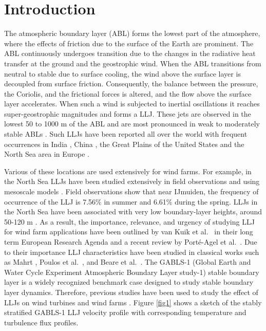 \documentclass[%
 aip,
 amsmath,amssymb,
preprint,%
author-numerical,%
]{revtex4-1}
\begin{document}
\section{Introduction}\label{sec1}
The atmospheric boundary layer (ABL) forms the lowest part of the atmosphere, where the effects of friction due to the surface of the Earth are prominent. The ABL continuously undergoes transition due to the changes in the radiative heat transfer at the ground and the geostrophic wind. When the ABL transitions from neutral to stable due to surface cooling, the wind above the surface layer is decoupled from surface friction. Consequently, the balance between the {\color{black}pressure, the Coriolis, and the frictional forces is altered, and} the flow above the surface layer accelerates. When such a wind is subjected to inertial oscillations it reaches super-geostrophic magnitudes and forms a LLJ. These jets are observed in the lowest 50 to 1000 m of the ABL \citep{sme96} and are most pronounced in weak to moderately stable ABLs \cite{baa09, ban08}. Such LLJs \cite{kel04, ban02, sme93} have been reported all over the world with frequent occurrences in India \cite{pra11}, China \cite{liu14}, the Great Plains of the United States \cite{arr97} and the North Sea area in Europe \cite{kal19, wag19}.

Various of these locations are used extensively for wind farms. For example, in the North Sea LLJs have been studied extensively in field observations \cite{kal17, dun18} and using mesoscale models \cite{kal19}. Field observations show that near IJmuiden, the frequency of occurrence of the LLJ is 7.56\% in summer and 6.61\% during the spring. LLJs in the North Sea have been associated with very low boundary-layer heights, around 50-120 m \cite{dun18}. As a result, the importance, relevance, and urgency of studying LLJ for wind farm applications have been outlined by van Kuik et al.\ \cite{kui16} in their long term European Research Agenda and a recent review by Port\'e-Agel et al.\ \cite{por20}. Due to their importance LLJ characteristics have been studied in classical works such as Mahrt \cite{mah99}, Poulos et al.\ \cite{pou02}, and Beare et al.\ \cite{bea06}. The GABLS-1 (Global Earth and Water Cycle Experiment Atmospheric Boundary Layer study-1) stable boundary layer is a widely recognized benchmark case designed to study stable boundary layer dynamics. Therefore, previous studies have been used to study the effect of LLJs on wind turbines and wind farms \cite{wu11, bha14, bha15, na18}. Figure \ref{fig1} shows a sketch of the stably stratified GABLS-1 LLJ velocity profile with corresponding temperature and turbulence flux profiles.
\end{document}
